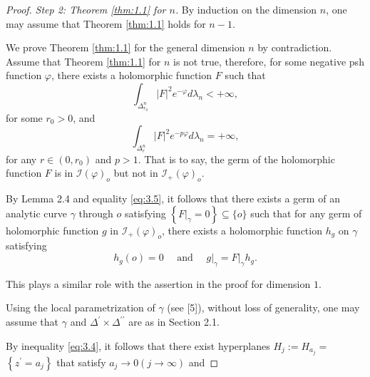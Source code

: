\begin{proof}
\textit{Step 2: Theorem \ref{thm:1.1} for $n$.} By induction on the dimension $n$, one may assume that Theorem \ref{thm:1.1} holds for $n-1$.

We prove Theorem \ref{thm:1.1} for the general dimension $n$ by contradiction. Assume that Theorem \ref{thm:1.1} for $n$ is not true, therefore, for some negative psh function $\varphi$, there exists a holomorphic function $F$ such that
\begin{equation}\label{eq:3.4}
    \int_{\Delta_{r_0}^n}|F|^2 e^{-\varphi} d \lambda_n<+\infty,
\end{equation}
for some $r_0>0$, and
\begin{equation}\label{eq:3.5}
    \int_{\Delta_r^n}|F|^2 e^{-p \varphi} d \lambda_n=+\infty,
\end{equation}
for any $r \in\left(0, r_0\right)$ and $p>1$. That is to say, the germ of the holomorphic function $F$ is in $\mathcal{I}(\varphi)_o$ but not in $\mathcal{I}_{+}(\varphi)_o$.

By Lemma 2.4 and equality \ref{eq:3.5}, it follows that there exists a germ of an analytic curve $\gamma$ through $o$ satisfying $\left\{\left.F\right|_\gamma=0\right\} \subseteq\{o\}$ such that for any germ of holomorphic function $g$ in $\mathcal{I}_{+}(\varphi)_o$, there exists a holomorphic function $h_g$ on $\gamma$ satisfying
\begin{equation}\label{eq:3.6}
    h_g(o)=0 \quad \text { and }\left.\quad g\right|_\gamma=\left.F\right|_\gamma h_g .
\end{equation}

This plays a similar role with the assertion in the proof for dimension $1$.

Using the local parametrization of $\gamma$ (see [5]), without loss of generality, one may assume that $\gamma$ and $\Delta^{\prime} \times \Delta^{\prime \prime}$ are as in Section 2.1.

By inequality \eqref{eq:3.4}, it follows that there exist hyperplanes $H_j:=H_{a_j}=$ $\left\{z^{\prime}=a_j\right\}$ that satisfy $a_j \rightarrow 0(j \rightarrow \infty)$ and


\end{proof}
